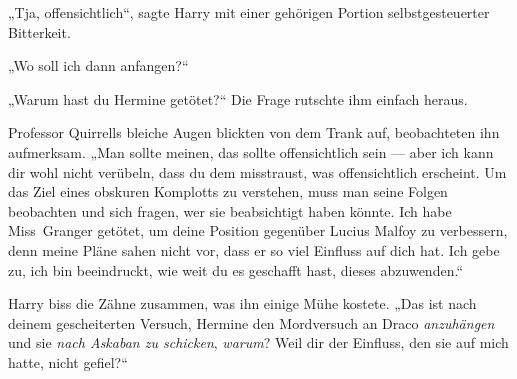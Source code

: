 „Tja, offensichtlich“, sagte Harry mit einer gehörigen Portion selbstgesteuerter Bitterkeit.

„Wo soll ich dann anfangen?“

„Warum hast du Hermine getötet?“
Die Frage rutschte ihm einfach heraus.

Professor Quirrells bleiche Augen blickten von dem Trank auf, beobachteten ihn aufmerksam.
„Man sollte meinen, das sollte offensichtlich sein — aber ich kann dir wohl nicht verübeln, dass du dem misstraust, was offensichtlich erscheint. Um das Ziel eines obskuren Komplotts zu verstehen, muss man seine Folgen beobachten und sich fragen, wer sie beabsichtigt haben könnte. Ich habe Miss~Granger getötet, um deine Position gegenüber Lucius Malfoy zu verbessern, denn meine Pläne sahen nicht vor, dass er so viel Einfluss auf dich hat. Ich gebe zu, ich bin beeindruckt, wie weit du es geschafft hast, dieses abzuwenden.“

Harry biss die Zähne zusammen, was ihn einige Mühe kostete.
„Das ist nach deinem gescheiterten Versuch, Hermine den Mordversuch an Draco \emph{anzuhängen} und sie \emph{nach Askaban zu schicken}, \emph{warum}? Weil dir der Einfluss, den sie auf mich hatte, nicht gefiel?“

